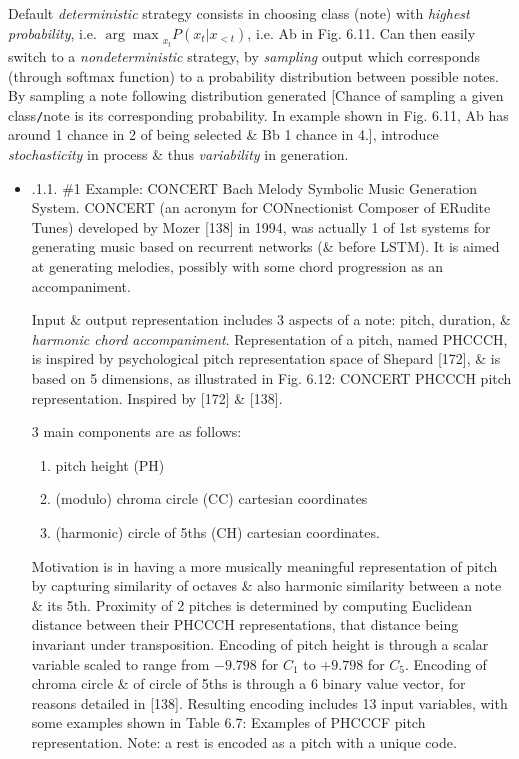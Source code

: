 \documentclass{article}
\begin{document}
\begin{itemize}
\begin{itemize}
\begin{itemize}
			Default {\it deterministic} strategy consists in choosing class (note) with {\it highest probability}, i.e. ${\arg\max}_{x_t} P(x_t|x_{<t})$, i.e. Ab in {\sf Fig. 6.11}. Can then easily switch to a {\it nondeterministic} strategy, by {\it sampling} output which corresponds (through softmax function) to a probability distribution between possible notes. By sampling a note following distribution generated [Chance of sampling a given class{\tt/}note is its corresponding probability. In example shown in {\sf Fig. 6.11}, Ab has around 1 chance in 2 of being selected \& Bb 1 chance in 4.], introduce {\it stochasticity} in process \& thus {\it variability} in generation.
			\begin{itemize}
				\item {.1.1. \#1 Example: CONCERT Bach Melody Symbolic Music Generation System.} CONCERT (an acronym for CONnectionist Composer of ERudite Tunes) developed by Mozer [138] in 1994, was actually 1 of 1st systems for generating music based on recurrent networks (\& before LSTM). It is aimed at generating melodies, possibly with some chord progression as an accompaniment.

				Input \& output representation includes 3 aspects of a note: pitch, duration, \& {\it harmonic chord accompaniment}. Representation of a pitch, named PHCCCH, is inspired by psychological pitch representation space of Shepard [172], \& is based on 5 dimensions, as illustrated in {\sf Fig. 6.12: CONCERT PHCCCH pitch representation. Inspired by [172] \& [138].}

				3 main components are as follows:
				\begin{enumerate}
					\item pitch height (PH)
					\item (modulo) chroma circle (CC) cartesian coordinates
					\item (harmonic) circle of 5ths (CH) cartesian coordinates.
				\end{enumerate}
				Motivation is in having a more musically meaningful representation of pitch by capturing similarity of octaves \& also harmonic similarity between a note \& its 5th. Proximity of 2 pitches is determined by computing Euclidean distance between their PHCCCH representations, that distance being invariant under transposition. Encoding of pitch height is through a scalar variable scaled to range from $-9.798$ for $C_1$ to $+9.798$ for $C_5$. Encoding of chroma circle \& of circle of 5ths is through a 6 binary value vector, for reasons detailed in [138]. Resulting encoding includes 13 input variables, with some examples shown in {\sf Table 6.7: Examples of PHCCCF pitch representation.} Note: a rest is encoded as a pitch with a unique code.


\end{itemize}
\end{itemize}
\end{itemize}
\end{itemize}
\end{document}
